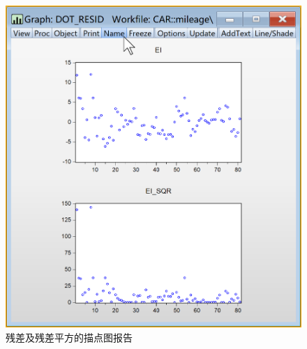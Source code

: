 \documentclass[12pt,(landscape,a4paper),(portrait,a4paper)]{article}
\begin{document}
\begin{figure}

{\centering \includegraphics[width=16.64in]{picture/lab6-heteroskedasticity/3-dot-resid-report} 

}

\caption{残差及残差平方的描点图报告}\label{fig:fig-dot-resid-report}
\end{figure}
\end{document}
